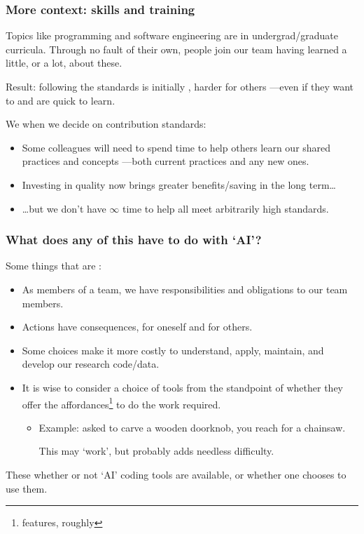 \documentclass[12pt,aspectratio=169]{beamer}
\begin{document}
\begin{frame}
\frametitle{More context: skills and training}

Topics like programming and software engineering are  in undergrad/graduate curricula.
Through no fault of their own,
people join our team having learned a little, or a lot, about these.

\bigskip
Result: following the standards is initially , harder for others
—even if they want to and are quick to learn.

\bigskip
We  when we decide on contribution standards:
\begin{itemize}
  \item Some colleagues will need to spend time to help others learn our shared practices and concepts%
    —both current practices and any new ones.
  \item Investing in quality now brings greater benefits/saving in the long term…
  \item …but we don't have $\infty$ time to help all meet arbitrarily high standards.
\end{itemize}
\end{frame}

\begin{frame}
\frametitle{What does any of this have to do with ‘AI’?}

Some things that are :
\begin{itemize}
  \item As members of a team, we have responsibilities and obligations to our team members.
  \item Actions have consequences, for oneself and for others.
  \item Some choices make it more costly to understand, apply, maintain, and develop our research code/data.
  \item It is wise to consider a choice of tools from the standpoint of
    whether they offer the affordances\footnote{features, roughly} to do the work required.
    \begin{itemize}
      \item Example: asked to carve a wooden doorknob,
        you reach for a chainsaw.

        This may ‘work’, but probably adds needless difficulty.
    \end{itemize}
\end{itemize}

\medskip
These  whether or not ‘AI’ coding tools are available,
or whether one chooses to use them.
\end{frame}
\end{document}
